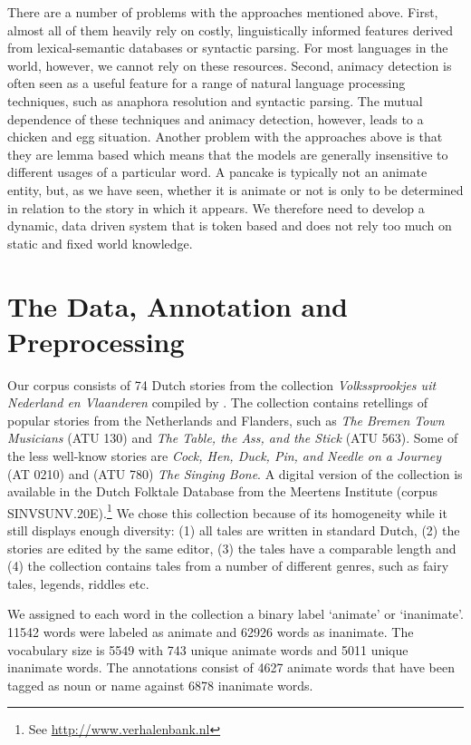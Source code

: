 \documentclass[a4paper,UKenglish]{oasics}
\begin{document}
There are a number of problems with the approaches mentioned
above. First, almost all of them heavily rely on costly,
linguistically informed features derived from lexical-semantic
databases or syntactic parsing. For most languages in the world,
however, we cannot rely on these resources. Second, animacy detection
is often seen as a useful feature for a range of natural language
processing techniques, such as anaphora resolution and syntactic
parsing. The mutual dependence of these techniques and animacy
detection, however, leads to a chicken and egg situation. Another
problem with the approaches above is that they are lemma based which
means that the models are generally insensitive to different usages of
a particular word. A pancake is typically not an animate entity, but,
as we have seen, whether it is animate or not is only to be determined
in relation to the story in which it appears. We therefore need to
develop a dynamic, data driven system that is token based and does not
rely too much on static and fixed world knowledge.

\section{The Data, Annotation and Preprocessing}\label{sec:data}

Our corpus consists of 74 Dutch stories from the collection
\textit{Volkssprookjes uit Nederland en Vlaanderen} compiled by
\cite{sinninghe:78}. The collection contains retellings of popular
stories from the Netherlands and Flanders, such as \textit{The Bremen
  Town Musicians} (ATU 130) and \textit{The Table, the Ass, and the
  Stick } (ATU 563). Some of the less well-know stories are
\textit{Cock, Hen, Duck, Pin, and Needle on a Journey} (AT 0210) and
(ATU 780) \textit{The Singing Bone}. A digital version of the
collection is available in the Dutch Folktale Database from the
Meertens Institute (corpus SINVSUNV.20E).\footnote{See
  \url{http://www.verhalenbank.nl}} We chose this collection because
of its homogeneity while it still displays enough diversity: (1) all
tales are written in standard Dutch, (2) the stories are edited by the
same editor, (3) the tales have a comparable length and (4) the
collection contains tales from a number of different genres, such as
fairy tales, legends, riddles etc.

We assigned to each word in the collection a binary label `animate' or
`inanimate'. 11542 words were labeled as animate and 62926 words as
inanimate. The vocabulary size is 5549 with 743 unique animate words
and 5011 unique inanimate words. The annotations consist of 4627
animate words that have been tagged as noun or name against 6878
inanimate words.
\end{document}
